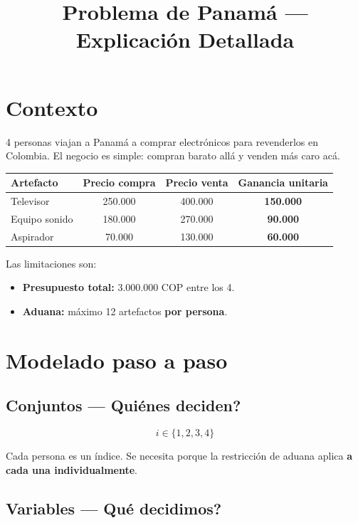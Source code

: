 \documentclass[12pt]{article}
\title{Problema de Panam\'a --- Explicaci\'on Detallada}
\author{}
\date{}
\begin{document}
\maketitle

\section{Contexto}

4 personas viajan a Panam\'a a comprar electr\'onicos para revenderlos en Colombia. El negocio es simple: compran barato all\'a y venden m\'as caro ac\'a.

\begin{table}[h]
\centering
\begin{tabular}{lccc}
\toprule
\textbf{Artefacto} & \textbf{Precio compra} & \textbf{Precio venta} & \textbf{Ganancia unitaria} \\
\midrule
Televisor      & 250.000 & 400.000 & \textbf{150.000} \\
Equipo sonido  & 180.000 & 270.000 & \textbf{90.000}  \\
Aspirador      &  70.000 & 130.000 & \textbf{60.000}  \\
\bottomrule
\end{tabular}
\end{table}

Las limitaciones son:
\begin{itemize}
    \item \textbf{Presupuesto total:} 3.000.000 COP entre los 4.
    \item \textbf{Aduana:} m\'aximo 12 artefactos \textbf{por persona}.
\end{itemize}

\section{Modelado paso a paso}

\subsection{Conjuntos --- \textquestiondown Qui\'enes deciden?}

\[
    i \in \{1, 2, 3, 4\}
\]

Cada persona es un \'indice. Se necesita porque la restricci\'on de aduana aplica \textbf{a cada una individualmente}.

\subsection{Variables --- \textquestiondown Qu\'e decidimos?}
\end{document}
